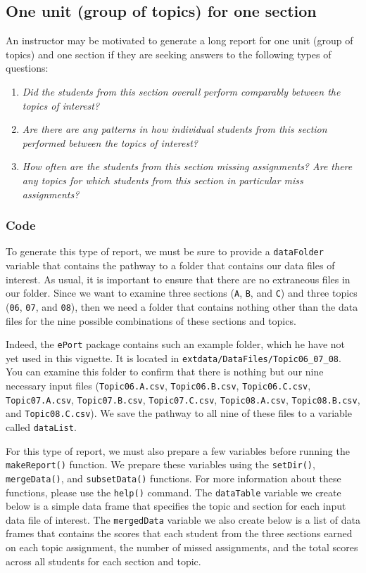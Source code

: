 \documentclass{article}\usepackage[]{graphicx}\usepackage[]{color}
\numberwithin{equation}{section} %
\begin{document}
\subsection{One unit (group of topics) for one section}

An instructor may be motivated to generate a long report for one unit (group of topics) and one section if they are seeking answers to the following types of questions:

\begin{enumerate}
\item \textit{Did the students from this section overall perform comparably between the topics of interest?}
\item \textit{Are there are any patterns in how individual students from this section performed between the topics of interest?}
\item \textit{How often are the students from this section missing assignments? Are there any topics for which students from this section in particular miss assignments?}
\end{enumerate}

\subsubsection{Code}

To generate this type of report, we must be sure to provide a \texttt{dataFolder} variable that contains the pathway to a folder that contains our data files of interest. As usual, it is important to ensure that there are no extraneous files in our folder. Since we want to examine three sections (\texttt{A}, \texttt{B}, and \texttt{C}) and three topics (\texttt{06}, \texttt{07}, and \texttt{08}), then we need a folder that contains nothing other than the data files for the nine possible combinations of these sections and topics.

Indeed, the \texttt{ePort} package contains such an example folder, which he have not yet used in this vignette. It is located in \texttt{extdata/DataFiles/Topic06\_07\_08}. You can examine this folder to confirm that there is nothing but our nine necessary input files (\texttt{Topic06.A.csv}, \texttt{Topic06.B.csv}, \texttt{Topic06.C.csv}, \texttt{Topic07.A.csv}, \texttt{Topic07.B.csv}, \texttt{Topic07.C.csv}, \texttt{Topic08.A.csv}, \texttt{Topic08.B.csv}, and \texttt{Topic08.C.csv}). We save the pathway to all nine of these files to a variable called \texttt{dataList}.

For this type of report, we must also prepare a few variables before running the \texttt{makeReport()} function. We prepare these variables using the \texttt{setDir()}, \texttt{mergeData()}, and \texttt{subsetData()} functions. For more information about these functions, please use the \texttt{help()} command. The \texttt{dataTable} variable we create below is a simple data frame that specifies the topic and section for each input data file of interest. The \texttt{mergedData} variable we also create below is a list of data frames that contains the scores that each student from the three sections earned on each topic assignment, the number of missed assignments, and the total scores across all students for each section and topic.
\end{document}
